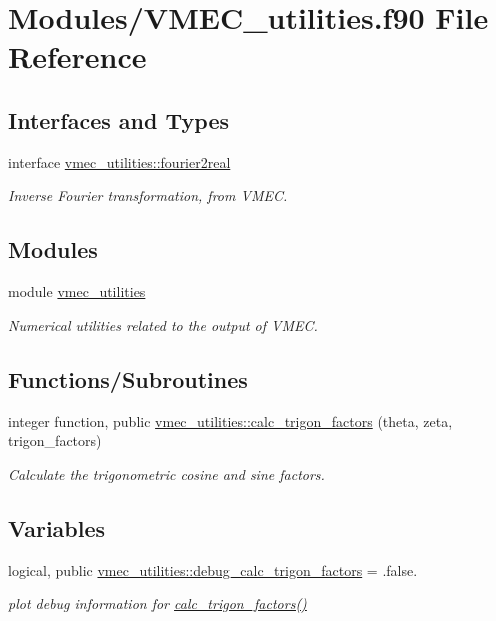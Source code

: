 \hypertarget{VMEC__utilities_8f90}{}\section{Modules/\+V\+M\+E\+C\+\_\+utilities.f90 File Reference}
\label{VMEC__utilities_8f90}
\subsection*{Interfaces and Types}
\begin{DoxyCompactItemize}
\item 
interface \hyperlink{interfacevmec__utilities_1_1fourier2real}{vmec\+\_\+utilities\+::fourier2real}
\begin{DoxyCompactList}\small\item\em Inverse Fourier transformation, from V\+M\+EC. \end{DoxyCompactList}\end{DoxyCompactItemize}
\subsection*{Modules}
\begin{DoxyCompactItemize}
\item 
module \hyperlink{namespacevmec__utilities}{vmec\+\_\+utilities}
\begin{DoxyCompactList}\small\item\em Numerical utilities related to the output of V\+M\+EC. \end{DoxyCompactList}\end{DoxyCompactItemize}
\subsection*{Functions/\+Subroutines}
\begin{DoxyCompactItemize}
\item 
integer function, public \hyperlink{namespacevmec__utilities_ac699116fc25fdea3e28e488513d97c87}{vmec\+\_\+utilities\+::calc\+\_\+trigon\+\_\+factors} (theta, zeta, trigon\+\_\+factors)
\begin{DoxyCompactList}\small\item\em Calculate the trigonometric cosine and sine factors. \end{DoxyCompactList}\end{DoxyCompactItemize}
\subsection*{Variables}
\begin{DoxyCompactItemize}
\item 
logical, public \hyperlink{namespacevmec__utilities_abeb2bf5595170bdf2dd07a6f2bfa89ff}{vmec\+\_\+utilities\+::debug\+\_\+calc\+\_\+trigon\+\_\+factors} = .false.
\begin{DoxyCompactList}\small\item\em plot debug information for \hyperlink{namespacevmec__utilities_ac699116fc25fdea3e28e488513d97c87}{calc\+\_\+trigon\+\_\+factors()} \end{DoxyCompactList}\end{DoxyCompactItemize}
